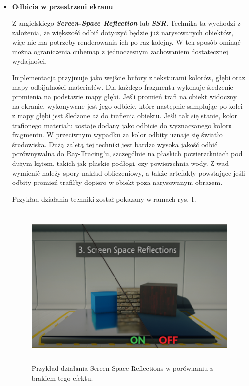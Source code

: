 \begin{itemize}
	\item \textbf{Odbicia w przestrzeni ekranu}

	Z angielskiego \emph{\textbf{Screen-Space Reflection}} lub \emph{\textbf{SSR}}. Technika ta wychodzi z założenia, że większość odbić dotyczyć będzie już narysowanych obiektów, więc nie ma potrzeby renderowania ich po raz kolejny. W ten sposób ominąć można ograniczenia cubemap z jednoczesnym zachowaniem dostatecznej wydajności.

	Implementacja przyjmuje jako wejście bufory z teksturami kolorów, głębi oraz mapy odbijalności materiałów. Dla każdego fragmentu wykonuje śledzenie promienia na podstawie mapy głębi. Jeśli promień trafi na obiekt widoczny na ekranie, wykonywane jest jego odbicie, które następnie samplując po kolei z mapy głębi jest śledzone aż do trafienia obiektu. Jeśli tak się stanie, kolor trafionego materiału zostaje dodany jako odbicie do wyznaczanego koloru fragmentu. W przeciwnym wypadku za kolor odbity uznaje się światło środowiska.
	Dużą zaletą tej techniki jest bardzo wysoka jakość odbić porównywalna do Ray-Tracing'u, szczególnie na płaskich powierzchniach pod dużym kątem, takich jak płaskie podłogi, czy powierzchnia wody. Z wad wymienić należy spory nakład obliczeniowy, a także artefakty powstające jeśli odbity promień trafiłby dopiero w obiekt poza narysowanym obrazem.

	Przykład działania techniki został pokazany w ramach rys. \ref{intro-ssr}.

	\vfill
	\clearpage

	\begin{figure}[htbp]
		\centering
		\includegraphics[width=5.06667in,height=3.2316in]{images/11_screen_space_reflections.png}
		\caption{Przykład działania Screen Space Reflections w porównaniu z brakiem tego efektu. \cite{flaxengine:ssr:2024}}
		\label{intro-ssr}
	\end{figure}


\end{itemize}
